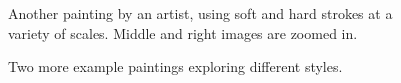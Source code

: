 \documentclass[review]{acmsiggraph}
\begin{document}
\begin{figure}
    \centering
    \caption{Another painting by an artist, using soft and hard strokes at a variety of scales.  Middle and right images are zoomed in.}
    \label{fig:stop}
\end{figure}

\begin{figure}
    \centering
    \caption{Two more example paintings exploring different styles.}
    \label{fig:stop}
\end{figure}
\end{document}
